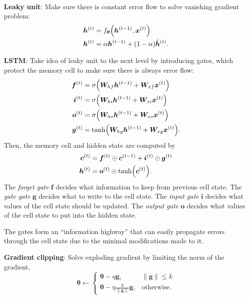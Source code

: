 \documentclass{article}
\newcommand{\lft}{\mathopen{}\mathclose\bgroup\left}
\newcommand{\rgt}{\aftergroup\egroup\right}
\renewcommand{\vec}[1]{\bm{#1}}
\newcommand{\mat}[1]{\bm{#1}}
\newenvironment{topic}[1]
{\textbf{\sffamily \colorbox{black}{\rlap{\textbf{\textcolor{white}{#1}}}\hspace{\linewidth}\hspace{-2\fboxsep}}} \\ \vspace{0.2cm}}
{}
\begin{document}
\begin{multicols*}{2}
\begin{topic}{Recurrent neural networks}
        \textbf{Leaky unit}: Make sure there is constant error flow to solve vanishing gradient problem:
        \begin{align*}
            \hat{\vec{h}}^{(t)} & = f_{\vec{\theta}}\lft( \vec{h}^{(t-1)}, \vec{x}^{(t)} \rgt) \\
            \vec{h}^{(t)}       & = \alpha \vec{h}^{(t-1)} + (1-\alpha) \hat{\vec{h}}^{(t)}.
        \end{align*}

        \textbf{LSTM}: Take idea of leaky unit to the next level by introducing gates, which protect the memory cell to make sure there is always error flow:
        \begin{align*}
            \vec{f}^{(t)} & = \sigma \lft( \mat{W}_{hf} \vec{h}^{(t-1)} + \mat{W}_{xf} \vec{x}^{(t)} \rgt) \\
            \vec{i}^{(t)} & = \sigma \lft( \mat{W}_{hi} \vec{h}^{(t-1)} + \mat{W}_{xi} \vec{x}^{(t)} \rgt) \\
            \vec{o}^{(t)} & = \sigma \lft( \mat{W}_{ho} \vec{h}^{(t-1)} + \mat{W}_{xo} \vec{x}^{(t)} \rgt) \\
            \vec{g}^{(t)} & = \tanh \lft( \mat{W}_{hg} \vec{h}^{(t-1)} + \mat{W}_{xg} \vec{x}^{(t)} \rgt).
        \end{align*}
        Then, the memory cell and hidden state are computed by
        \begin{align*}
            \vec{c}^{(t)} & = \vec{f}^{(t)} \odot \vec{c}^{(t-1)} + \vec{i}^{(t)} \odot \vec{g}^{(t)} \\
            \vec{h}^{(t)} & = \vec{o}^{(t)} \odot \tanh \lft( \vec{c}^{(t)} \rgt).
        \end{align*}
        The \textit{forget gate} $\vec{f}$ decides what information to keep from previous cell state. The \textit{gate
            gate} $\vec{g}$ decides what to write to the cell state. The \textit{input gate} $\vec{i}$ decides what
        values of the cell state should be updated. The \textit{output gate} $\vec{o}$ decides what values of
        the cell state to put into the hidden state.

        The gates form an ``information highway'' that can easily propagate errors through the cell state
        due to the minimal modifications made to it.

        \textbf{Gradient clipping}: Solve exploding gradient by limiting the norm of the gradient, \[
            \vec{\theta} \gets \begin{cases}
                \vec{\theta} - \eta \vec{g},                         & \| \vec{g} \| \leq k \\
                \vec{\theta} - \eta \frac{k}{\| \vec{g} \|} \vec{g}, & \text{otherwise}.
            \end{cases}
        \]


\end{topic}
\end{multicols*}
\end{document}
